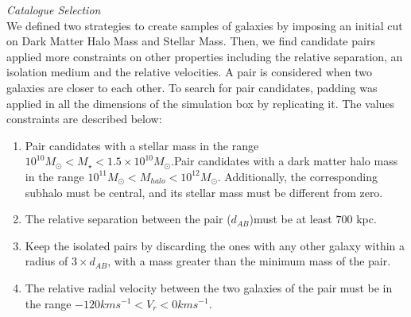 \documentclass[fleqn,usenatbib]{mnras}
\begin{document}
\textit{Catalogue Selection}\\
We defined two strategies to create samples of galaxies by imposing an initial cut on Dark Matter Halo Mass and Stellar Mass. %
Then, we find candidate pairs applied more constraints on other properties including the relative separation, an isolation medium and the relative velocities. A pair is considered when two galaxies are closer to each other. To search for pair candidates, padding was applied in all the dimensions of the simulation box by replicating it. The values constraints are described below:
\begin{enumerate}[i]
  \item Pair candidates with a stellar mass in the range $10^{10}M_\odot <M_\star<1.5\times 10^{10}M_\odot$.Pair candidates with a dark matter halo mass in the range $10^{11}M_\odot<M_{halo}<10^{12}M_\odot$. Additionally, the corresponding subhalo must be central, and its stellar mass must be different from zero. 
  \item The relative separation between the pair ($d_{AB}$)must be at least $700$ kpc. 
  \item Keep the isolated pairs by discarding the ones with any other galaxy within a radius of $3\times d_{AB}$, with a mass greater than the minimum mass of the pair. 
  \item The relative radial velocity between the two galaxies of the pair must be in the range $-120 km s^{-1}<V_r<0 km s^{-1}$. 
\end{enumerate}
\end{document}
